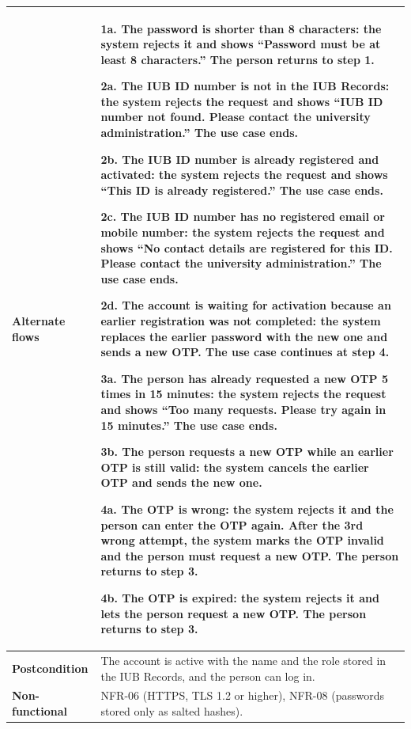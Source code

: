 \documentclass[11pt,a4paper]{report}
\begin{document}
\begin{longtable}{|>{\raggedright\arraybackslash}p{3.0cm}|>{\raggedright\arraybackslash}p{12.4cm}|}
\textbf{Alternate flows} & 1a. The password is shorter than 8 characters: the system rejects it and shows ``Password must be at least 8 characters.'' The person returns to step 1.\par\smallskip 2a. The IUB ID number is not in the IUB Records: the system rejects the request and shows ``IUB ID number not found. Please contact the university administration.'' The use case ends.\par\smallskip 2b. The IUB ID number is already registered and activated: the system rejects the request and shows ``This ID is already registered.'' The use case ends.\par\smallskip 2c. The IUB ID number has no registered email or mobile number: the system rejects the request and shows ``No contact details are registered for this ID. Please contact the university administration.'' The use case ends.\par\smallskip 2d. The account is waiting for activation because an earlier registration was not completed: the system replaces the earlier password with the new one and sends a new OTP. The use case continues at step 4.\par\smallskip 3a. The person has already requested a new OTP 5 times in 15 minutes: the system rejects the request and shows ``Too many requests. Please try again in 15 minutes.'' The use case ends.\par\smallskip 3b. The person requests a new OTP while an earlier OTP is still valid: the system cancels the earlier OTP and sends the new one.\par\smallskip 4a. The OTP is wrong: the system rejects it and the person can enter the OTP again. After the 3rd wrong attempt, the system marks the OTP invalid and the person must request a new OTP. The person returns to step 3.\par\smallskip 4b. The OTP is expired: the system rejects it and lets the person request a new OTP. The person returns to step 3. \\ \hline
\textbf{Postcondition} & The account is active with the name and the role stored in the IUB Records, and the person can log in. \\ \hline
\textbf{Non-functional} & NFR-06 (HTTPS, TLS 1.2 or higher), NFR-08 (passwords stored only as salted hashes). \\ \hline
\end{longtable}
\end{document}
